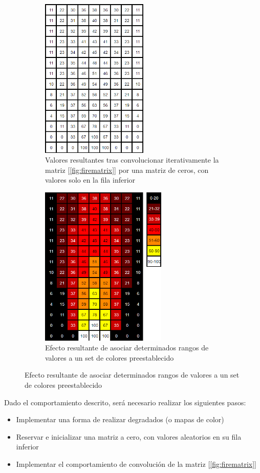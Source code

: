 \begin{figure}[h]
	\centering
	\begin{subfigure}[b]{0.45\textwidth}
		\centering
		\includegraphics[width=5.09cm]{archivos/fire_whitegrid}
		\caption{Valores resultantes tras convolucionar iterativamente la matriz [\ref{fig:firematrix}] por una matriz de ceros, con valores solo en la fila inferior}
		\label{fig:fire_whitegrid}
	\end{subfigure}
	\begin{subfigure}[b]{0.45\textwidth}
		\centering
		\includegraphics[width=6cm]{archivos/fire_colouredgrid}
		\caption{Efecto resultante de asociar determinados rangos de valores a un set de colores preestablecido}
		\label{fig:fire_colouredgrid}
	\end{subfigure}
\end{figure}

Dado el comportamiento descrito, será necesario realizar los siguientes pasos:
\begin{itemize}
	\item Implementar una forma de realizar degradados (o mapas de color)
	\item Reservar e inicializar una matriz a cero, con valores aleatorios en su fila inferior
	\item Implementar el comportamiento de convolución de la matriz [\ref{fig:firematrix}]
\end{itemize}

